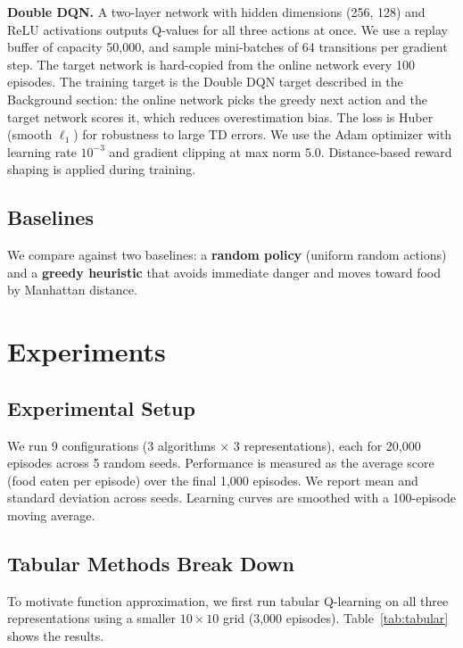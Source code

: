 \documentclass[letterpaper]{article}
\begin{document}
\textbf{Double DQN.} A two-layer network with hidden dimensions (256, 128) and ReLU activations outputs Q-values for all three actions at once. We use a replay buffer of capacity 50,000, and sample mini-batches of 64 transitions per gradient step. The target network is hard-copied from the online network every 100 episodes. The training target is the Double DQN target described in the Background section: the online network picks the greedy next action and the target network scores it, which reduces overestimation bias. The loss is Huber (smooth $\ell_1$) for robustness to large TD errors. We use the Adam optimizer \cite{kingma2015adam} with learning rate $10^{-3}$ and gradient clipping at max norm 5.0. Distance-based reward shaping is applied during training.

\subsection{Baselines}

We compare against two baselines: a \textbf{random policy} (uniform random actions) and a \textbf{greedy heuristic} that avoids immediate danger and moves toward food by Manhattan distance.

\section{Experiments}

\subsection{Experimental Setup}

We run 9 configurations (3 algorithms $\times$ 3 representations), each for 20,000 episodes across 5 random seeds. Performance is measured as the average score (food eaten per episode) over the final 1,000 episodes. We report mean and standard deviation across seeds. Learning curves are smoothed with a 100-episode moving average.

\subsection{Tabular Methods Break Down}

To motivate function approximation, we first run tabular Q-learning on all three representations using a smaller $10 \times 10$ grid (3,000 episodes). Table~\ref{tab:tabular} shows the results.
\end{document}
